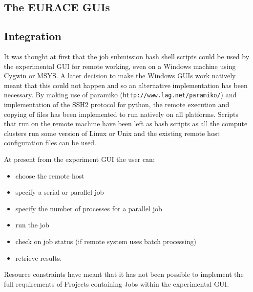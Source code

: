\subsection{The EURACE GUIs}
\subsection{Integration}
It was thought at first that the job submission bash shell scripts could be used by the experimental GUI for remote working, even on a Windows machine using Cygwin or MSYS. A later decision to make the Windows GUIs work natively meant that this could not happen and so an alternative implementation has been necessary. By making use of paramiko (\verb+http://www.lag.net/paramiko/+) and implementation of the SSH2 protocol for python, the remote execution and copying of files has been implemented to run natively on all platforms.  Scripts that run on the remote machine have been left as bash scripts as all the compute clusters run some version of Linux or Unix and the existing remote host configuration files can be used. 

At present from the experiment GUI the user can:

\begin{itemize}
\item choose the remote host
\item specify a serial or parallel job
\item specify the number of processes for a parallel job
\item run the job
\item check on job status (if remote system uses batch processing)
\item retrieve results.
\end{itemize}

Resource constraints have meant that it has not been possible to implement the full requirements of Projects containing Jobs within the experimental GUI.


